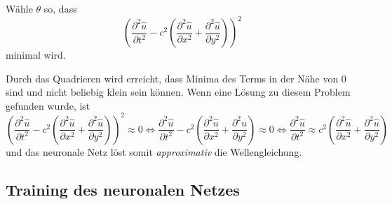 Wähle \( \theta \) so, dass
\begin{equation}
    \left(\frac{\partial^2 \hat{u}}{\partial t^2} - c^2 \left( \frac{\partial^2 \hat{u}}{\partial x^2} + \frac{\partial^2 \hat{u}}{\partial y^2} \right)\right)^2
    \label{neuronal:optimierung}
\end{equation}
minimal wird.\newline

Durch das Quadrieren wird erreicht, dass Minima des Terms in der Nähe von 0 sind und nicht beliebig klein sein können.
Wenn eine Lösung zu diesem Problem gefunden wurde, ist
\begin{equation}
    \left(\frac{\partial^2 \hat{u}}{\partial t^2} - c^2 \left( \frac{\partial^2 \hat{u}}{\partial x^2} + \frac{\partial^2 \hat{u}}{\partial y^2} \right)\right)^2 \approx 0
    \iff
    \frac{\partial^2 \hat{u}}{\partial t^2} - c^2 \left( \frac{\partial^2 \hat{u}}{\partial x^2} + \frac{\partial^2 \hat{u}}{\partial y^2} \right) \approx 0
    \iff
    \frac{\partial^2 \hat{u}}{\partial t^2} \approx c^2 \left( \frac{\partial^2 \hat{u}}{\partial x^2} + \frac{\partial^2 \hat{u}}{\partial y^2} \right)
\end{equation}
und das neuronale Netz löst somit \emph{approximativ} die Wellengleichung.


\subsection{Training des neuronalen Netzes}\label{neuronal:subsection:training_nn}

